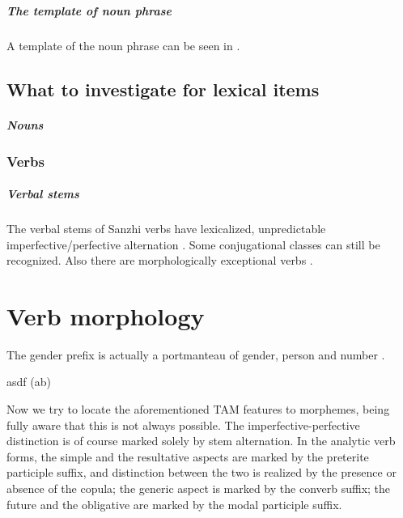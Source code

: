 \documentclass[a4paper, oneside, 12pt]{report}
\newcommand*{\citesec}[1]{\S~{#1}}
\newcommand*{\citetable}[1]{Table~{#1}}
\newcommand{\source}[1]{\hspace{\fill}\mbox{}\linebreak[0]\hspace*{\fill}\mbox{(\small #1)}}
\begin{document}
\paragraph*{The template of noun phrase} A template of the noun phrase 
can be seen in \citet[\citesec{21.1.3}]{forker2020grammar}.

\section{What to investigate for lexical items}

\paragraph*{Nouns}

\subsection{Verbs}

\paragraph*{Verbal stems} The verbal stems of Sanzhi verbs have 
lexicalized, unpredictable imperfective/perfective alternation
\citep[\citesec{11.2}]{forker2020grammar}.
Some conjugational classes can still be recognized.
Also there are morphologically exceptional verbs 
\citep[\citesec{11.2.7}]{forker2020grammar}.


\chapter{Verb morphology}

The gender prefix is actually a portmanteau of 
gender, person and number \citep[\citetable{20.1}]{forker2020grammar}.

\begin{exe}
    \ex asdf \source{ab}
\end{exe}

Now we try to locate the aforementioned TAM features to morphemes, 
being fully aware that this is not always possible. 
The imperfective-perfective distinction is of course marked 
solely by stem alternation.
In the analytic verb forms, 
the simple and the resultative aspects
are marked by the preterite participle suffix, 
and distinction between the two is realized by the 
presence or absence of the copula; 
the generic aspect is marked by the converb suffix; 
the future and the obligative are marked by 
the modal participle suffix.
\end{document}
